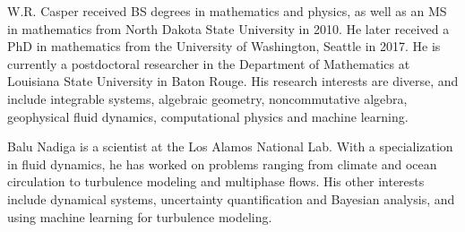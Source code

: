 \documentclass[10pt,journal,compsoc]{IEEEtran} %
\theoremstyle{definition}
\begin{document}
 

\begin{IEEEbiography}{W.R. Casper}
received BS degrees in mathematics and physics, as well as an MS in
mathematics from North Dakota State University in 2010.  He later
received a PhD in mathematics from the University of Washington,
Seattle in 2017.  He is currently a postdoctoral researcher in the
Department of Mathematics at Louisiana State University in Baton
Rouge.  His research interests are diverse, and include integrable
systems, algebraic geometry, noncommutative algebra, geophysical fluid
dynamics, computational physics and machine learning. 
\end{IEEEbiography}

\begin{IEEEbiography}{Balu
    Nadiga} is a scientist at the Los Alamos National Lab. With a
  specialization in fluid dynamics, he has worked on problems ranging
  from climate and ocean circulation to turbulence modeling and
  multiphase flows. His other interests include dynamical systems,
  uncertainty quantification and Bayesian analysis, and using machine learning
  for turbulence modeling.
\end{IEEEbiography}
\end{document}
